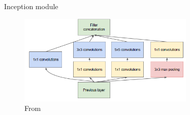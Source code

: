 \documentclass[xcolor=pdftex,dvipsnames,table,mathserif]{beamer}
\begin{document}
\begin{frame}{Inception module}

\begin{figure}[ht]
  \centering
  \includegraphics[width=0.75\textwidth]{inception_module.png}
  \caption{\tiny{From \cite{szegedy_going_2014}}}
\end{figure}

\end{frame}
\end{document}
